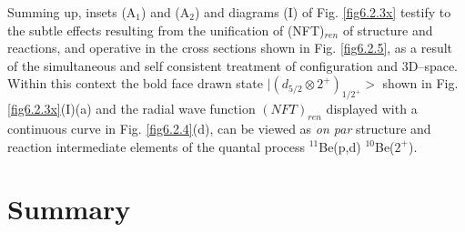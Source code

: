    
   Summing up, insets 
   (A$_1$) and (A$_2$)  and diagrams (I) of Fig. \ref{fig6.2.3x} testify to the subtle effects resulting  from the unification of (NFT)$_{ren}$ of structure 
   and reactions, and operative in the cross sections shown in Fig. \ref{fig6.2.5}, as a result of the 
   simultaneous and self consistent treatment of configuration and 3D--space.  Within this context
   the bold face drawn state $| (d_{5/2} \otimes 2^+)_{1/2^+}>$ shown in Fig. \ref{fig6.2.3x}(I)(a) 
   and the radial  wave function $(NFT)_{ren}$ displayed with a continuous curve in Fig. \ref{fig6.2.4}(d), can be viewed as {\it on par} structure and reaction 
   intermediate elements of the quantal process $^{11}$Be(p,d) $^{10}$Be($2^+$).
   
   
\section{Summary}
